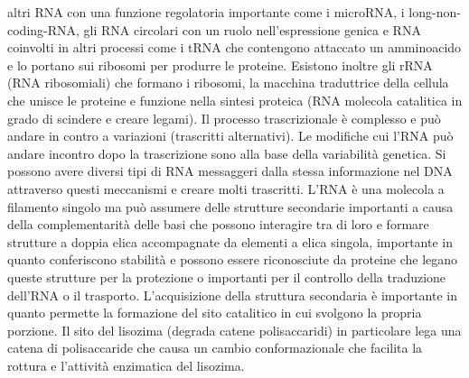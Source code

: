 altri RNA con una funzione regolatoria importante come i microRNA, i long-non-coding-RNA, gli RNA circolari con un ruolo nell'espressione genica e RNA coinvolti in altri processi come i 
tRNA che contengono attaccato un amminoacido e lo portano sui ribosomi per produrre le proteine. Esistono inoltre gli rRNA (RNA ribosomiali) che formano i ribosomi, la macchina 
traduttrice della cellula che unisce le proteine e funzione nella sintesi proteica (RNA molecola catalitica in grado di scindere e creare legami). Il processo trascrizionale \`e 
complesso e pu\`o andare in contro a variazioni (trascritti alternativi). Le modifiche cui l'RNA pu\`o andare incontro dopo la trascrizione sono alla base della variabilit\`a genetica. 
Si possono avere diversi tipi di RNA messaggeri dalla stessa informazione nel DNA attraverso questi meccanismi e creare molti trascritti. L'RNA \`e una molecola a filamento singolo ma 
pu\`o assumere delle strutture secondarie importanti a causa della complementarit\`a delle basi che possono interagire tra di loro e formare strutture a doppia elica accompagnate da 
elementi a elica singola, importante in quanto conferiscono stabilit\`a e possono essere riconosciute da proteine che legano queste strutture per la protezione o importanti per il 
controllo della traduzione dell'RNA o il trasporto. L'acquisizione della struttura secondaria \`e importante in quanto permette la formazione del sito catalitico in cui svolgono la 
propria porzione. Il sito del lisozima (degrada catene polisaccaridi) in particolare lega una catena di polisaccaride che causa un cambio conformazionale che facilita la rottura e 
l'attivit\`a enzimatica del lisozima. 
